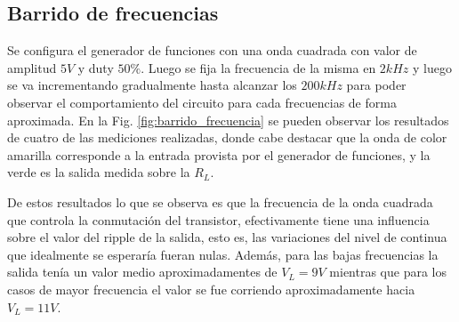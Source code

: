 \subsection{Barrido de frecuencias}
Se configura el generador de funciones con una onda cuadrada con valor de amplitud $5V$ y duty $50\%$. Luego se fija la frecuencia de la misma en $2kHz$ y luego
se va incrementando gradualmente hasta alcanzar los $200kHz$ para poder observar el comportamiento del circuito para cada frecuencias de forma aproximada. En la Fig.
\ref{fig:barrido_frecuencia} se pueden observar los resultados de cuatro de las mediciones realizadas, donde cabe destacar que la onda de color amarilla corresponde a la entrada
provista por el generador de funciones, y la verde es la salida medida sobre la $R_L$.

De estos resultados lo que se observa es que la frecuencia de la onda cuadrada que controla la conmutaci\'on del transistor, efectivamente tiene una influencia sobre el valor del ripple
de la salida, esto es, las variaciones del nivel de continua que idealmente se esperar\'ia fueran nulas. Adem\'as, para las bajas frecuencias la salida ten\'ia un valor medio aproximadamentes de $V_L = 9V$ mientras que para los casos
de mayor frecuencia el valor se fue corriendo aproximadamente hacia $V_L = 11V$.


